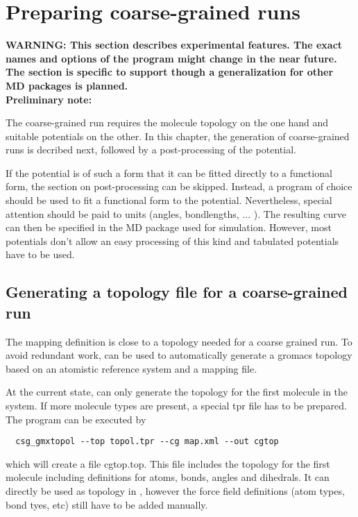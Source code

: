 \chapter{Preparing coarse-grained runs}
\label{sec:usage:cgrun}
\textbf{WARNING: This section describes experimental features. The exact names and options of the program might change in the near future.  The section is specific to \gromacs support though a generalization for other MD packages is planned.}
$$$$
\textbf{Preliminary note:}

The coarse-grained run requires the molecule topology on the one hand and suitable potentials on the other. In this chapter, the generation of coarse-grained runs is decribed next, followed by a post-processing of the potential.

If the potential is of such a form that it can be fitted directly to a functional form, the section on post-processing can be skipped. Instead, a program of choice should be used to fit a functional form to the potential. Nevertheless, special attention should be paid to units (angles, bondlengths, ... \todo). The resulting curve can then be specified in the MD package used for simulation. However, most potentials don't allow an easy processing of this kind and tabulated potentials have to be used.

\section{Generating a topology file for a coarse-grained run}
The mapping definition is close to a topology needed for a coarse grained run. To avoid redundant work,  can be used to automatically generate a gromacs topology based on an atomistic reference system and a mapping file.

At the current state,  can only generate the topology for the first molecule in the system. If more molecule types are present, a special tpr file has to be prepared. The program can be executed by
\begin{verbatim}
  csg_gmxtopol --top topol.tpr --cg map.xml --out cgtop
\end{verbatim}
which will create a file cgtop.top. This file includes the topology for the first molecule including definitions for atoms, bonds, angles and dihedrals. It can directly be used as topology in \gromacs, however the force field definitions (atom types, bond tyes, etc) still have to be added manually.

